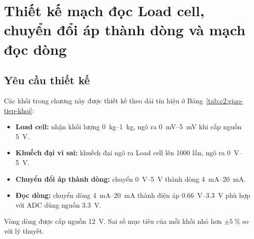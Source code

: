 \chapter{Thiết kế mạch đọc Load cell, chuyển đổi áp thành dòng và mạch đọc dòng}
\label{chap:c3}

\section{Yêu cầu thiết kế}
\label{sec:c3:yeu-cau}

Các khối trong chương này được thiết kế theo dải tín hiệu ở Bảng~\ref{tab:c2:giao-tiep-khoi}:
\begin{itemize}
    \item \textbf{Load cell:} nhận khối lượng \qtyrange{0}{1}{\kilo\gram}, ngõ ra \qtyrange{0}{5}{\milli\volt}
          khi cấp nguồn \qty{5}{\volt}.
    \item \textbf{Khuếch đại vi sai:} khuếch đại ngõ ra Load cell lên 1000 lần, ngõ ra \qtyrange{0}{5}{\volt}.
    \item \textbf{Chuyển đổi áp thành dòng:} chuyển \qtyrange{0}{5}{\volt} thành dòng \qtyrange{4}{20}{\milli\ampere}.
    \item \textbf{Đọc dòng:} chuyển dòng \qtyrange{4}{20}{\milli\ampere} thành điện áp \qtyrange{0.66}{3.3}{\volt}
          phù hợp với ADC dùng nguồn \qty{3.3}{\volt}.
\end{itemize}
Vòng dòng được cấp nguồn \qty{12}{\volt}. Sai số mục tiêu của mỗi khối nhỏ hơn $\pm\qty{5}{\percent}$ so với
lý thuyết.

